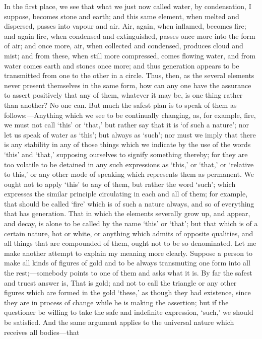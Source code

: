In the first place, we see that what we just now called water, by
condensation, I suppose, becomes stone and earth; and this same element,
when melted and dispersed, passes into vapour and air. Air, again, when
inflamed, becomes fire; and again fire, when condensed and extinguished,
passes once more into the form of air; and once more, air, when collected
and condensed, produces cloud and mist; and from these, when still more
compressed, comes flowing water, and from water comes earth and stones
once more; and thus generation appears to be transmitted from one to the
other in a circle. Thus, then, as the several elements never present
themselves in the same form, how can any one have the assurance to assert
positively that any of them, whatever it may be, is one thing rather than
another? No one can. But much the safest plan is to speak of them as
follows:—Anything which we see to be continually changing, as, for
example, fire, we must not call ‘this’ or ‘that,’ but rather say that it
is ‘of such a nature’; nor let us speak of water as ‘this’; but always as
‘such’; nor must we imply that there is any stability in any of those
things which we indicate by the use of the words ‘this’ and ‘that,’
supposing ourselves to signify something thereby; for they are too
volatile to be detained in any such expressions as ‘this,’ or ‘that,’ or
‘relative to this,’ or any other mode of speaking which represents them as
permanent. We ought not to apply ‘this’ to any of them, but rather the
word ‘such’; which expresses the similar principle circulating in each and
all of them; for example, that should be called ‘fire’ which is of such a
nature always, and so of everything that has generation. That in which the
elements severally grow up, and appear, and decay, is alone to be called
by the name ‘this’ or ‘that’; but that which is of a certain nature, hot
or white, or anything which admits of opposite qualities, and all things
that are compounded of them, ought not to be so denominated. Let me make
another attempt to explain my meaning more clearly. Suppose a person to
make all kinds of figures of gold and to be always transmuting one form
into all the rest;—somebody points to one of them and asks what it
is. By far the safest and truest answer is, That is gold; and not to call
the triangle or any other figures which are formed in the gold ‘these,’ as
though they had existence, since they are in process of change while he is
making the assertion; but if the questioner be willing to take the safe
and indefinite expression, ‘such,’ we should be satisfied. And the same
argument applies to the universal nature which receives all bodies—that
